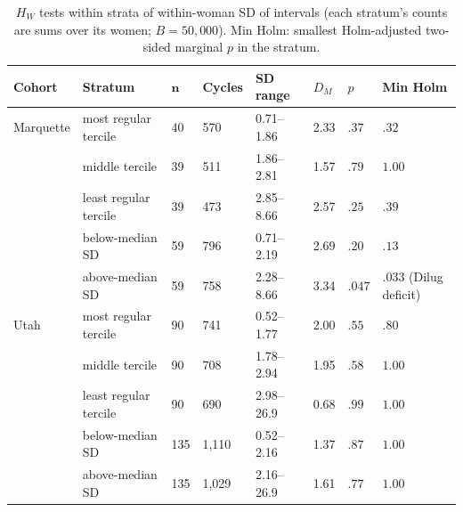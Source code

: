 \documentclass[12pt]{article}
\newcommand{\HW}{H_{W}}
\newcommand{\DM}{D_{M}}
\begin{document}
\begin{table}[!htbp]
\centering
\caption{$\HW$ tests within strata of within-woman SD of intervals (each stratum's counts
  are sums over its women; $B = 50{,}000$). Min Holm: smallest Holm-adjusted two-sided
  marginal $p$ in the stratum.}
\label{tab:si-strata}
\smallskip
\small
\begin{tabular}{L{1.6cm} L{3.0cm} C{0.9cm} C{1.1cm} C{1.8cm} C{1.0cm} C{1.0cm} C{2.0cm}}
\toprule
\textbf{Cohort} & \textbf{Stratum} & $\mathbf{n}$ & \textbf{Cycles} & \textbf{SD range} & $\DM$ & $p$ & \textbf{Min Holm} \\
\midrule
Marquette & most regular tercile  & 40 & 570 & 0.71--1.86 & 2.33 & $.37$ & $.32$ \\
          & middle tercile        & 39 & 511 & 1.86--2.81 & 1.57 & $.79$ & $1.00$ \\
          & least regular tercile & 39 & 473 & 2.85--8.66 & 2.57 & $.25$ & $.39$ \\
          & below-median SD       & 59 & 796 & 0.71--2.19 & 2.69 & $.20$ & $.13$ \\
          & above-median SD       & 59 & 758 & 2.28--8.66 & 3.34 & $.047$ & $.033$ (Dilug deficit) \\
\midrule
Utah      & most regular tercile  & 90 & 741 & 0.52--1.77 & 2.00 & $.55$ & $.80$ \\
          & middle tercile        & 90 & 708 & 1.78--2.94 & 1.95 & $.58$ & $1.00$ \\
          & least regular tercile & 90 & 690 & 2.98--26.9 & 0.68 & $.99$ & $1.00$ \\
          & below-median SD       & 135 & 1,110 & 0.52--2.16 & 1.37 & $.87$ & $1.00$ \\
          & above-median SD       & 135 & 1,029 & 2.16--26.9 & 1.61 & $.77$ & $1.00$ \\
\bottomrule
\end{tabular}
\end{table}
\end{document}
